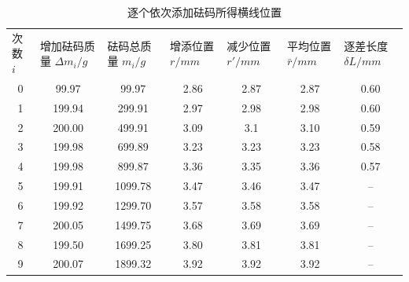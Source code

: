 \documentclass{ctexart}
\begin{document}
\begin{table}[H]
    \centering
    \caption{逐个依次添加砝码所得横线位置}
    \resizebox{\textwidth}{!}
    {
      \begin{tabular}{ccccccc}
      \multicolumn{1}{l}{次数 $i$} & \multicolumn{1}{l}{增加砝码质量 $\Delta m_i /g$} & \multicolumn{1}{l}{砝码总质量 $m_i /g$} & \multicolumn{1}{l}{增添位置 $r/mm$} & \multicolumn{1}{l}{减少位置 $r'/mm$} & \multicolumn{1}{l}{平均位置 $\bar{r}/mm$} & \multicolumn{1}{l}{逐差长度 $\delta L/mm$} \\
      0     & 99.97 & 99.97 & 2.86  & 2.87  & 2.87  & 0.60  \\
      1     & 199.94 & 299.91  & 2.97  & 2.98  & 2.98  & 0.60  \\
      2     & 200.00 & 499.91  & 3.09  & 3.1   & 3.10  & 0.59  \\
      3     & 199.98 & 699.89  & 3.23  & 3.23  & 3.23  & 0.58  \\
      4     & 199.98 & 899.87  & 3.36  & 3.35  & 3.36  & 0.57  \\
      5     & 199.91 & 1099.78  & 3.47  & 3.46  & 3.47  & -- \\
      6     & 199.92 & 1299.70  & 3.57  & 3.58  & 3.58  & -- \\
      7     & 200.05 & 1499.75  & 3.68  & 3.69  & 3.69  & -- \\
      8     & 199.50 & 1699.25  & 3.80  & 3.81  & 3.81  & -- \\
      9     & 200.07 & 1899.32  & 3.92  & 3.92  & 3.92  & -- \\
      \end{tabular}%
    }
    \label{tab:addlabel}%
  \end{table}%
\end{document}
